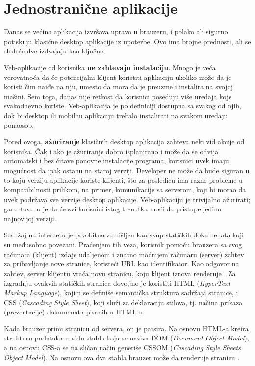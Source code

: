 \section{Jednostranične aplikacije}

Danas se većina aplikacija izvršava upravo u brauzeru, i polako ali sigurno potiskuju klasične desktop aplikacije iz upoterbe.
Ovo ima brojne prednosti, ali se sledeće dve izdvajaju kao ključne.

Veb-aplikacije od korisnika \textbf{ne zahtevaju instalaciju}.
Mnogo je veća verovatnoća da će potencijalni klijent koristiti aplikaciju ukoliko može da je koristi čim naiđe na nju, umesto da mora da je preuzme i instalira na svojoj mašini.
Sem toga, danas nije retkost da korisnici poseduju više uredaja koje svakodnevno koriste.
Veb-aplikacija je po definiciji dostupna sa svakog od njih, dok bi desktop ili mobilnu aplikaciju trebalo instalirati na svakom uredaju ponaosob.

Pored ovoga, \textbf{ažuriranje} klasičnih desktop aplikacija zahteva neki vid akcije od korisnika.
Čak i ako je ažuriranje dobro isplanirano i može da se odvija automatski i bez čitave ponovne instalacije programa, korisnici uvek imaju mogućnost da ipak ostanu na staroj verziji.
Developer ne može da bude siguran u to koju verziju aplikacije koriste klijenti, što za posledicu ima razne probleme u kompatibilnosti prilikom, na primer, komunikacije sa serverom, koji bi morao da uvek podržava sve verzije desktop aplikacije.
Veb-aplikaciju je trivijalno ažurirati; garantovano je da će svi korisnici istog trenutka moći da pristupe jedino najnovijoj verziji.

Sadržaj na internetu je prvobitno zamišljen kao skup statičkih dokumenata koji su međusobno povezani.
Praćenjem tih veza, korisnik pomoću brauzera sa svog računara (klijent) izdaje udaljenom i znatno moćnijem računaru (server) zahtev za pribavljanje nove stranice, koristeći URL kao identifikator.
Kao odgovor na zahtev, server klijentu vraća novu stranicu, koju klijent iznova renderuje \cite{lee:answers-for-young-people}.
Za izgradnju ovakvih statičkih stranica dovoljno je koristiti HTML (\textsl{HyperText Markup Language}), kojim se definiše semantička struktura sadržaja stranice, i CSS (\textsl{Cascading Style Sheet}), koji služi za deklaraciju stilova, tj. načina prikaza (prezentacije) dokumenata pisanih u HTML-u.

Kada brauzer primi stranicu od servera, on je parsira.
Na osnovu HTML-a kreira strukturu podataka u vidu stabla koja se naziva DOM (\textsl{Document Object Model}), a na osnovu CSS-a se na sličan način generiše CSSOM (\textsl{Cascading Style Sheets Object Model}).
Na osnovu ova dva stabla brauzer može da renderuje stranicu \cite{mdn:getting-started-with-the-web}.

